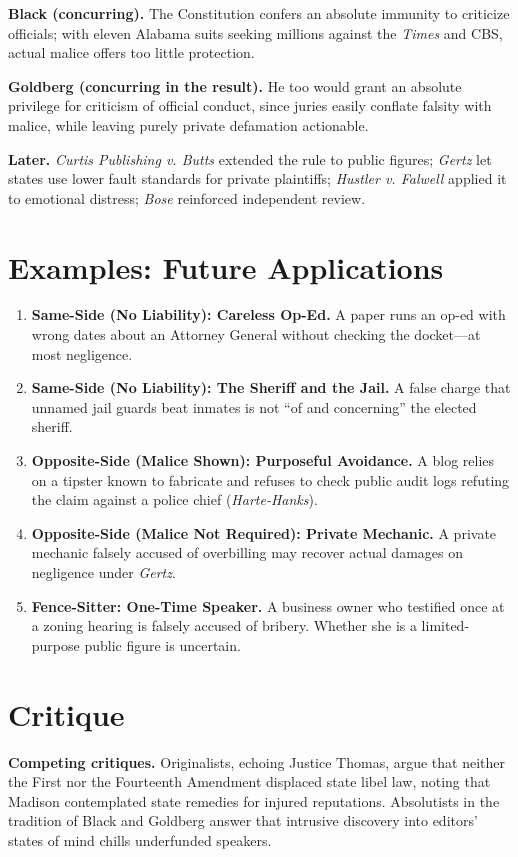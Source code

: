 \documentclass[12pt]{article}
\begin{document}
\textbf{Black (concurring).} The Constitution confers an absolute immunity to criticize officials; with eleven Alabama suits seeking millions against the \textit{Times} and CBS, actual malice offers too little protection.

\textbf{Goldberg (concurring in the result).} He too would grant an absolute privilege for criticism of official conduct, since juries easily conflate falsity with malice, while leaving purely private defamation actionable.

\textbf{Later.} \textit{Curtis Publishing v. Butts} extended the rule to public figures; \textit{Gertz} let states use lower fault standards for private plaintiffs; \textit{Hustler v. Falwell} applied it to emotional distress; \textit{Bose} reinforced independent review.

\section{Examples: Future Applications}

\begin{enumerate}
\item \textbf{Same-Side (No Liability): Careless Op-Ed.} A paper runs an op-ed with wrong dates about an Attorney General without checking the docket---at most negligence.
\item \textbf{Same-Side (No Liability): The Sheriff and the Jail.} A false charge that unnamed jail guards beat inmates is not ``of and concerning'' the elected sheriff.
\item \textbf{Opposite-Side (Malice Shown): Purposeful Avoidance.} A blog relies on a tipster known to fabricate and refuses to check public audit logs refuting the claim against a police chief (\textit{Harte-Hanks}).
\item \textbf{Opposite-Side (Malice Not Required): Private Mechanic.} A private mechanic falsely accused of overbilling may recover actual damages on negligence under \textit{Gertz}.
\item \textbf{Fence-Sitter: One-Time Speaker.} A business owner who testified once at a zoning hearing is falsely accused of bribery. Whether she is a limited-purpose public figure is uncertain.
\end{enumerate}

\section{Critique}

\textbf{Competing critiques.} Originalists, echoing Justice Thomas, argue that neither the First nor the Fourteenth Amendment displaced state libel law, noting that Madison contemplated state remedies for injured reputations. Absolutists in the tradition of Black and Goldberg answer that intrusive discovery into editors' states of mind chills underfunded speakers.
\end{document}
